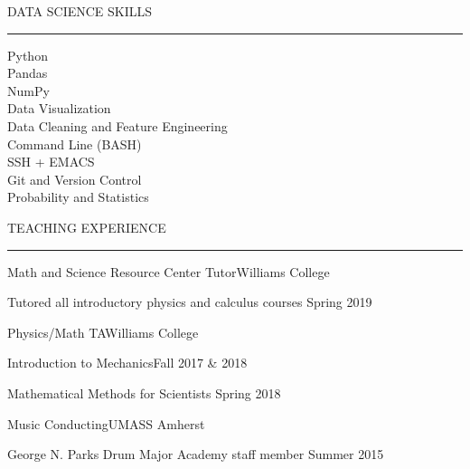 \documentclass{resume} %
\renewenvironment{rSection}[1]{
	\sectionskip
	\textcolor{RoyalPurple}{\MakeUppercase{#1}}
	\sectionlineskip
	\hrule
	\begin{list}{}{
			\setlength{\leftmargin}{1.5em}
		}
		\item[]
	}{
	\end{list}
}
\begin{document}
\begin{rSection}{Data Science Skills} \itemsep -2pt
	{Python} \\
	{Pandas}  \\
	{NumPy}  \\
	{Data Visualization} \\
	{Data Cleaning and Feature Engineering} \\
	{Command Line (BASH)} \\ 
	{SSH + EMACS} \\
	{Git and Version Control} \\
	{Probability and Statistics}
	
\end{rSection}


\begin{rSection}{Teaching Experience} \itemsep -2pt
		\begin{rSubsection}{Math and Science Resource Center Tutor}{}{}{Williams College}{}
		\item {Tutored all introductory physics and calculus courses} \hfill {Spring 2019}
	\end{rSubsection}
	\begin{rSubsection}{Physics/Math TA}{}{}{Williams College}{}
		\item {Introduction to Mechanics}\hfill{Fall 2017 \& 2018}
		\item {Mathematical Methods for Scientists} \hfill {Spring 2018}
		\end{rSubsection}
	\begin{rSubsection}{Music Conducting}{}{}{UMASS Amherst}{}
		\item {George N. Parks Drum Major Academy staff member} \hfill {Summer 2015}
	\end{rSubsection}
\end{rSection}
\end{document}

